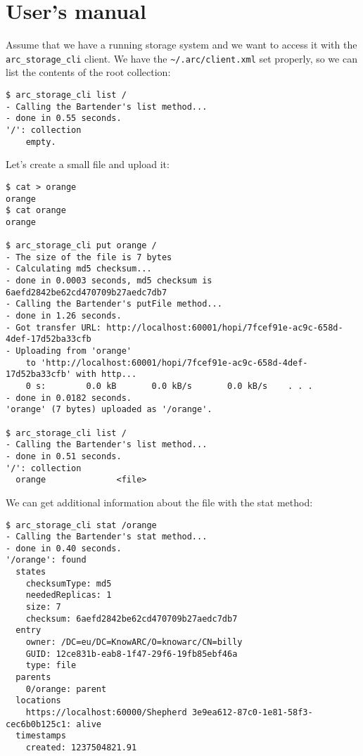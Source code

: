 \documentclass{book}
\begin{document}

\chapter{User's manual} %
\label{cha:user_s_manual}

Assume that we have a running storage system and we want to access it with the \verb!arc_storage_cli! client. We have the \verb!~/.arc/client.xml! set properly, so we can list the contents of the root collection:

\begin{verbatim}
$ arc_storage_cli list /
- Calling the Bartender's list method...
- done in 0.55 seconds.
'/': collection
    empty.
\end{verbatim}

Let's create a small file and upload it:

\begin{verbatim}
$ cat > orange
orange
$ cat orange 
orange

$ arc_storage_cli put orange /
- The size of the file is 7 bytes
- Calculating md5 checksum...
- done in 0.0003 seconds, md5 checksum is 6aefd2842be62cd470709b27aedc7db7
- Calling the Bartender's putFile method...
- done in 1.26 seconds.
- Got transfer URL: http://localhost:60001/hopi/7fcef91e-ac9c-658d-4def-17d52ba33cfb
- Uploading from 'orange'
    to 'http://localhost:60001/hopi/7fcef91e-ac9c-658d-4def-17d52ba33cfb' with http...
    0 s:        0.0 kB       0.0 kB/s       0.0 kB/s    . . .       
- done in 0.0182 seconds.
'orange' (7 bytes) uploaded as '/orange'.

$ arc_storage_cli list /
- Calling the Bartender's list method...
- done in 0.51 seconds.
'/': collection
  orange              <file>

\end{verbatim}

We can get additional information about the file with the stat method:

\begin{verbatim}
$ arc_storage_cli stat /orange
- Calling the Bartender's stat method...
- done in 0.40 seconds.
'/orange': found
  states
    checksumType: md5
    neededReplicas: 1
    size: 7
    checksum: 6aefd2842be62cd470709b27aedc7db7
  entry
    owner: /DC=eu/DC=KnowARC/O=knowarc/CN=billy
    GUID: 12ce831b-eab8-1f47-29f6-19fb85ebf46a
    type: file
  parents
    0/orange: parent
  locations
    https://localhost:60000/Shepherd 3e9ea612-87c0-1e81-58f3-cec6b0b125c1: alive
  timestamps
    created: 1237504821.91
\end{verbatim}
\end{document}
